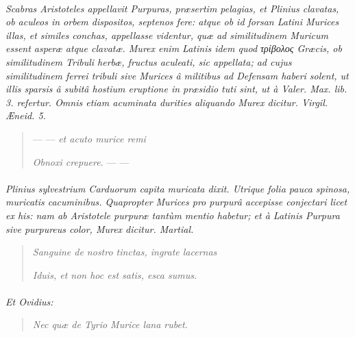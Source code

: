 \documentclass[a4paper, 11pt, oneside, polutonikogreek, german]{article}
\begin{document}
\paragraph{}
\emph{Scabras Aristoteles appellavit Purpuras, præsertim pelagias, et Plinius clavatas, ob aculeos in orbem dispositos, septenos fere: atque ob id forsan Latini Murices illas, et similes conchas, appellasse videntur, quæ ad similitudinem Muricum essent asperæ atque clavatæ. Murex enim Latinis idem quod τρίβολος Græcis, ob similitudinem Tribuli herbæ, fructus aculeati, sic appellata; ad cujus similitudinem ferrei tribuli sive Murices â militibus ad Defensam haberi solent, ut illis sparsis â subitâ hostium eruptione in præsidio tuti sint, ut à Valer. Max. lib. 3. refertur. Omnis etiam acuminata durities aliquando Murex dicitur. Virgil. Æneid. 5.}
\begin{quotation}
--- --- \emph{et acuto murice remi}

\emph{Obnoxi crepuere.} --- ---
\end{quotation}
\paragraph{}
\emph{Plinius sylvestrium Carduorum capita muricata dixit. Utrique folia pauca spinosa, muricatis cacuminibus. Quapropter Murices pro purpurâ accepisse conjectari licet ex his: nam ab Aristotele purpuræ tantùm mentio habetur; et à Latinis Purpura sive purpureus color, Murex dicitur. Martial.}
\begin{quotation}
\emph{Sanguine de nostro tinctas, ingrate lacernas}

\emph{Iduis, et non hoc est satis, esca sumus.}
\end{quotation}
\paragraph{}
\emph{Et Ovidius:}
\begin{quotation}
\emph{Nec quæ de Tyrio Murice lana rubet.}
\end{quotation}
\end{document}
